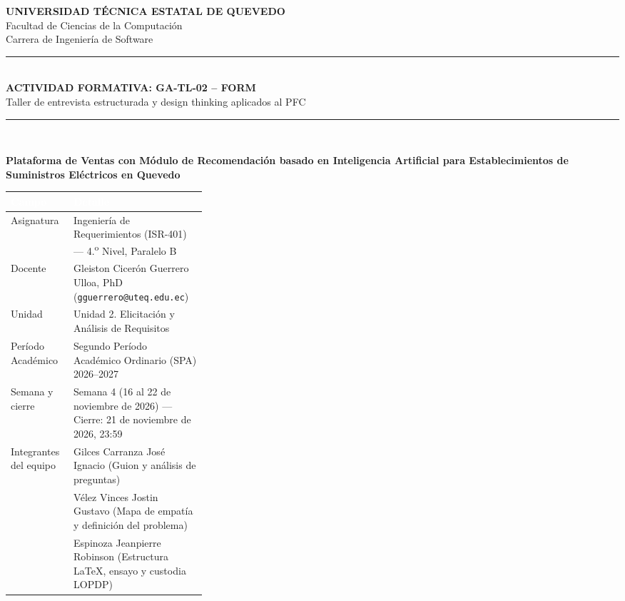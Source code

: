 \documentclass[11pt,a4paper]{article}
\newcommand{\thdr}[1]{\cellcolor{uteqgreen}\textcolor{white}{\textbf{#1}}}
\begin{document}
\begin{titlepage}
    \centering
    \vspace*{0.6cm}
    {\Large\textbf{\textcolor{uteqdark}{UNIVERSIDAD T\'ECNICA ESTATAL DE QUEVEDO}}}\\[0.25cm]
    {\large Facultad de Ciencias de la Computaci\'on}\\[0.15cm]
    {\large Carrera de Ingenier\'ia de Software}\\[0.8cm]

    \textcolor{uteqgreen}{\rule{\linewidth}{1.5pt}}\\[0.5cm]
    {\LARGE\textbf{ACTIVIDAD FORMATIVA: GA-TL-02 -- FORM}}\\[0.3cm]
    {\Large Taller de entrevista estructurada y design thinking aplicados al PFC}\\[0.45cm]
    \textcolor{uteqgreen}{\rule{\linewidth}{1.5pt}}\\[1.0cm]

    \begin{tcolorbox}[colback=boxbg,colframe=uteqgreen,boxrule=0.8pt,arc=2mm,title={\textbf{Proyecto Fin de Curso (PFC)}}]
        \centering
        \textbf{Plataforma de Ventas con M\'odulo de Recomendaci\'on basado en Inteligencia Artificial para Establecimientos de Suministros El\'ectricos en Quevedo}
    \end{tcolorbox}

    \vspace{0.8cm}

    \noindent\begin{tabularx}{\linewidth}{|p{0.32\linewidth}|Y|}
        \hline
        \thdr{Campo} & \thdr{Detalle}\\
        \hline
        Asignatura & Ingenier\'ia de Requerimientos (ISR-401) --- 4.\textsuperscript{o} Nivel, Paralelo B\\
        \hline
         Docente & Gleiston Cicer\'on Guerrero Ulloa, PhD (\texttt{gguerrero@uteq.edu.ec})\\
        \hline
        Unidad & Unidad 2. Elicitaci\'on y An\'alisis de Requisitos\\
        \hline
         Per\'iodo Acad\'emico & Segundo Per\'iodo Acad\'emico Ordinario (SPA) 2026--2027\\
        \hline
        Semana y cierre & Semana 4 (16 al 22 de noviembre de 2026) --- Cierre: 21 de noviembre de 2026, 23:59\\
        \hline
         Integrantes del equipo &
        Gilces Carranza Jos\'e Ignacio (Guion y an\'alisis de preguntas)\\
        & V\'elez Vinces Jostin Gustavo (Mapa de empat\'ia y definici\'on del problema)\\
        & Espinoza Jeanpierre Robinson (Estructura \LaTeX{}, ensayo y custodia LOPDP)\\
        \hline
    \end{tabularx}


\end{titlepage}
\end{document}
